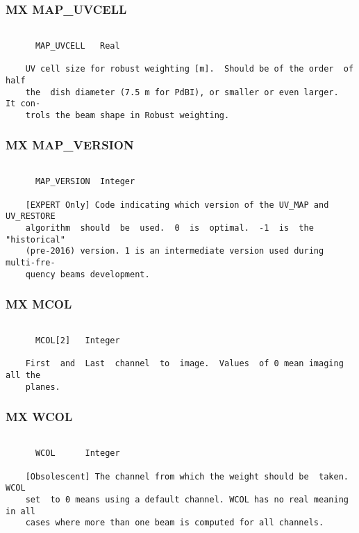 \subsubsection{MX MAP\_UVCELL}
\begin{verbatim}

      MAP_UVCELL   Real

    UV cell size for robust weighting [m].  Should be of the order  of  half
    the  dish diameter (7.5 m for PdBI), or smaller or even larger.  It con-
    trols the beam shape in Robust weighting.

\end{verbatim}
\subsubsection{MX MAP\_VERSION}
\begin{verbatim}

      MAP_VERSION  Integer

    [EXPERT Only] Code indicating which version of the UV_MAP and UV_RESTORE
    algorithm  should  be  used.  0  is  optimal.  -1  is  the  "historical"
    (pre-2016) version. 1 is an intermediate version used during  multi-fre-
    quency beams development.

\end{verbatim}
\subsubsection{MX MCOL}
\begin{verbatim}

      MCOL[2]   Integer

    First  and  Last  channel  to  image.  Values  of 0 mean imaging all the
    planes.

\end{verbatim}
\subsubsection{MX WCOL}
\begin{verbatim}

      WCOL      Integer

    [Obsolescent] The channel from which the weight should be  taken.   WCOL
    set  to 0 means using a default channel. WCOL has no real meaning in all
    cases where more than one beam is computed for all channels.


\end{verbatim}
